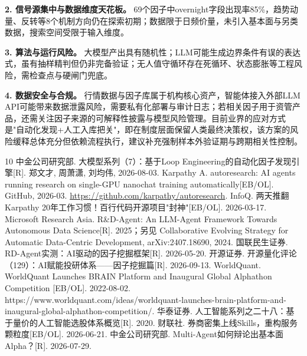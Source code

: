 \documentclass[UTF8,a4paper,zihao=-4,fontset=fandol]{ctexart}
\begin{document}
\textbf{2. 信号源集中与数据维度天花板。} 69个因子中overnight字段出现率85\%，趋势动量、反转等8个机制方向仍在探索初期；数据限于日频价量，未引入基本面与另类数据，搜索空间受限于输入维度\cite{cicc-loop-2026}。

\textbf{3. 算法与运行风险。} 大模型产出具有随机性；LLM可能生成边界条件有误的表达式，虽有抽样精判但仍非完备验证；无人值守循环存在死循环、状态膨胀等工程风险，需检查点与硬闸门兜底\cite{cicc-loop-2026}\cite{glms-rd-agent}。

\textbf{4. 数据安全与合规。} 行情数据与因子库属于机构核心资产，智能体接入外部LLM API可能带来数据泄露风险，需要私有化部署与审计日志；若相关因子用于资管产品，还需关注因子来源的可解释性披露与模型风险管理。目前业界的应对方式是"自动化发现+人工入库把关"，即在制度层面保留人类最终决策权\cite{glms-rd-agent}，该方案的风险缓释总体充分但依赖流程执行，建议补充强制样本外验证期与跨期相关性控制。

\begingroup\small\begin{thebibliography}{10}\setlength{\itemsep}{5pt}\setlength{\parsep}{0pt}
 中金公司研究部. 大模型系列（7）：基于Loop Engineering的自动化因子发现引擎[R]. 郑文才, 周萧潇, 刘均伟, 2026-08-03.
 Karpathy A. autoresearch: AI agents running research on single-GPU nanochat training automatically[EB/OL]. GitHub, 2026-03. \url{https://github.com/karpathy/autoresearch}.
 InfoQ. 两天推翻Karpathy 20年工作习惯！百行代码开源项目"封神"[EB/OL]. 2026-03-17.
 Microsoft Research Asia. R\&D-Agent: An LLM-Agent Framework Towards Autonomous Data Science[R]. 2025；另见 Collaborative Evolving Strategy for Automatic Data-Centric Development, arXiv:2407.18690, 2024.
 国联民生证券. RD-Agent实测：AI驱动的因子挖掘框架[R]. 2026-05-20.
 开源证券. 开源量化评论（129）：AI赋能投研体系——因子挖掘篇[R]. 2026-09-13.
 WorldQuant. WorldQuant Launches BRAIN Platform and Inaugural Global Alphathon Competition [EB/OL]. 2022-08-02. https://www.worldquant.com/ideas/worldquant-launches-brain-platform-and-inaugural-global-alphathon-competition/.
 华泰证券. 人工智能系列之二十八：基于量价的人工智能选股体系概览[R]. 2020.
 财联社. 券商密集上线Skills，重构服务颗粒度[EB/OL]. 2026-06-21.
 中金公司研究部. Multi-Agent如何辩论出基本面Alpha？[R]. 2026-07-29.\end{thebibliography}\endgroup
\clearpage
\begingroup
\linespread{1.15}\selectfont
\setlength{\parskip}{3pt}
\end{document}

